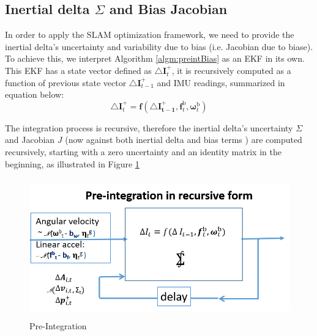 \documentclass[12pt]{article}   %
\begin{document}
\subsection{Inertial delta $\Sigma$ and Bias Jacobian}
In order to apply the SLAM optimization framework, we need to provide the inertial delta's uncertainty and variability due to bias (i.e. Jacobian due to biase). To achieve this, we interpret Algorithm \ref{algm:preintBias} as an EKF in its own. This EKF has a state vector defined as $\triangle \bm{I}^+_t$, it is recursively computed as a function of previous state vector $\triangle \bm{I}^+_{t-1}$ and IMU readings, summarized in equation below:
\begin{equation}
\triangle {\bm{I}}^+_t = \bm{f}( \bm{\triangle I^+_{t-1}}, \bm{f}^{\mathrm{b}}_{t}, \bm{\omega}^{\mathrm{b}}_{t})
\end{equation}


The integration process is recursive, therefore the inertial delta's uncertainty $\Sigma$ and Jacobian $J$ (now against both inertial delta and bias terms ) are computed recursively, starting with a zero uncertainty and an identity matrix in the beginning, as illustrated in Figure \ref{fig:preintBlock}

\begin{figure}[h!]
	\includegraphics[height=6cm]{figures/Pre-integration_block-flow.png}
	\caption{Pre-Integration}
	\label{fig:preintBlock}
\end{figure}
\end{document}
